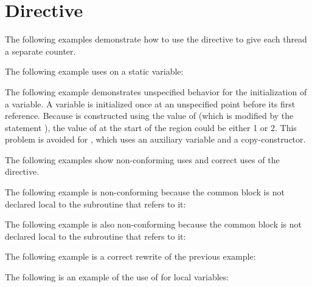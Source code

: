 \pagebreak
\section{ Directive}
\label{sec:threadprivate}

The following examples demonstrate how to use the  directive 
 to give each thread a separate counter.



\ccppspecificstart
The following example uses  on a static variable:


The following example demonstrates unspecified behavior for the initialization 
of a  variable. A   variable is initialized 
once at an unspecified point before its first reference. Because  is 
constructed using the value of   (which is modified by the statement 
), the value of   at the start of the  
region could be either 1 or 2. This problem is avoided for , which uses 
an auxiliary  variable and a copy-constructor.

\ccppspecificend

The following examples show non-conforming uses and correct uses of the  
directive. 

\fortranspecificstart
The following example is non-conforming because the common block is not declared 
local to the subroutine that refers to it:


The following example is also non-conforming because the common block is not declared 
local to the subroutine that refers to it:


The following example is a correct rewrite of the previous example:


The following is an example of the use of  for local variables:
\begin{figure}[t!]
\end{figure}

